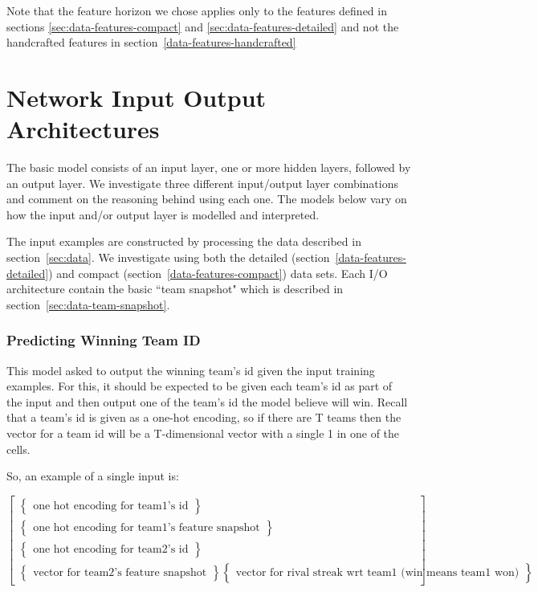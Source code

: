 \documentclass{article} %
\begin{document}
Note that the feature horizon we chose applies only to the features defined in sections \ref{sec:data-features-compact} and \ref{sec:data-features-detailed} and not the handcrafted features in section~\ref{data-features-handcrafted}


\section{Network Input Output Architectures}
\label{sec:io-architectures}

The basic model consists of an input layer, one or more hidden layers, followed by an output layer.  We investigate three different input/output layer combinations and comment on the reasoning behind using each one.  The models below vary on how the input and/or output layer is modelled and interpreted.


The input examples are constructed by processing the data described in section~\ref{sec:data}.  We investigate using both the detailed (section~\ref{data-features-detailed}) and compact (section~\ref{data-features-compact}) data sets.  Each I/O architecture contain the basic ``team snapshot" which is described in section~\ref{sec:data-team-snapshot}.

\subsubsection{Predicting Winning Team ID}
\label{sec:io-architectures-winning-team-id}

This model asked to output the winning team's id given the input training examples.  For this, it should be expected to be given each team's id as part of the input and then output one of the team's id the model believe will win.  Recall that a team's id is given as a one-hot encoding, so if there are T teams then the vector for a team id will be a T-dimensional vector with a single 1 in one of the cells.

So, an example of a single input is:

\[
\begin{bmatrix}
  \begin{Bmatrix}
    \text{one hot encoding for team1's id}
  \end{Bmatrix}
  \\
  \begin{Bmatrix}
    \text{one hot encoding for team1's feature snapshot}
  \end{Bmatrix}
  \\
  \begin{Bmatrix}
    \text{one hot encoding for team2's id}
  \end{Bmatrix}
  \\
  \begin{Bmatrix}
    \text{vector for team2's feature snapshot}
  \end{Bmatrix}
  \begin{Bmatrix}
    \text{vector for rival streak wrt team1 (win means team1 won)}
  \end{Bmatrix}
\end{bmatrix}
\]
\end{document}
